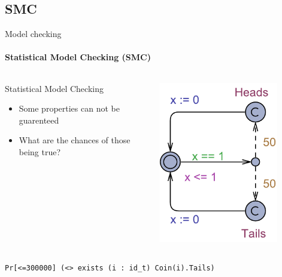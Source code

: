 \subsection{SMC}
\begin{frame}[t]{Model checking}
	\framesubtitle{Statistical Model Checking (SMC)}
	\begin{columns}[T]
		\begin{column}{.48\textwidth}
			Statistical Model Checking
			\begin{itemize}
				\item<+-> Some properties can not be guarenteed
				\item<+-> What are the chances of those being true?
			\end{itemize}
		\end{column}
		\begin{column}{.48\textwidth}
			\includegraphics[trim=0 200 0 200,width=0.8\textwidth]{images/Simple_SMC.pdf}
		\end{column}
	\end{columns}
	\vspace{80pt}
	\texttt{Pr[<=300000] (<> exists (i : id\_t) Coin(i).Tails)}
\end{frame}
